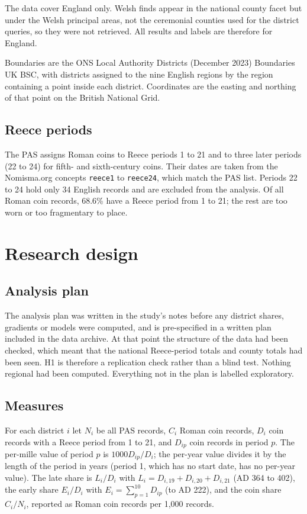 \documentclass[11pt,a4paper]{article}
\begin{document}
The data cover England only. Welsh finds appear in the national county facet but under the Welsh principal areas, not the ceremonial counties used for the district queries, so they were not retrieved. All results and labels are therefore for England.

Boundaries are the ONS Local Authority Districts (December 2023) Boundaries UK BSC, with districts assigned to the nine English regions by the region containing a point inside each district. Coordinates are the easting and northing of that point on the British National Grid.

\subsection{Reece periods}
The PAS assigns Roman coins to Reece periods 1 to 21 and to three later periods (22 to 24) for fifth- and sixth-century coins. Their dates are taken from the Nomisma.org concepts \texttt{reece1} to \texttt{reece24}, which match the PAS list. Periods 22 to 24 hold only 34 English records and are excluded from the analysis. Of all Roman coin records, 68.6\% have a Reece period from 1 to 21; the rest are too worn or too fragmentary to place.

\section{Research design}\label{sec:design}
\subsection{Analysis plan}
The analysis plan was written in the study's notes before any district shares, gradients or models were computed, and is pre-specified in a written plan included in the data archive. At that point the structure of the data had been checked, which meant that the national Reece-period totals and county totals had been seen. H1 is therefore a replication check rather than a blind test. Nothing regional had been computed. Everything not in the plan is labelled exploratory.

\subsection{Measures}
For each district $i$ let $N_i$ be all PAS records, $C_i$ Roman coin records, $D_i$ coin records with a Reece period from 1 to 21, and $D_{ip}$ coin records in period $p$. The per-mille value of period $p$ is $1000 D_{ip}/D_i$; the per-year value divides it by the length of the period in years (period 1, which has no start date, has no per-year value). The late share is $L_i/D_i$ with $L_i = D_{i,19}+D_{i,20}+D_{i,21}$ (AD 364 to 402), the early share $E_i/D_i$ with $E_i = \sum_{p=1}^{10} D_{ip}$ (to AD 222), and the coin share $C_i/N_i$, reported as Roman coin records per 1,000 records.
\end{document}
